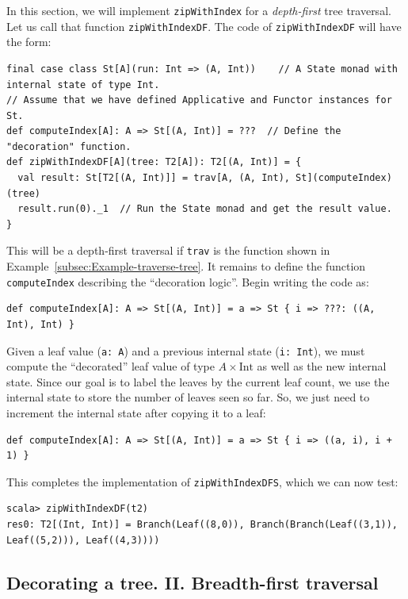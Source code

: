 In this section, we will implement \lstinline!zipWithIndex! for a
\emph{depth-first} tree traversal. Let us call that function \lstinline!zipWithIndexDF!.
The code of \lstinline!zipWithIndexDF! will have the form:
\begin{lstlisting}
final case class St[A](run: Int => (A, Int))    // A State monad with internal state of type Int.
// Assume that we have defined Applicative and Functor instances for St.
def computeIndex[A]: A => St[(A, Int)] = ???  // Define the "decoration" function.
def zipWithIndexDF[A](tree: T2[A]): T2[(A, Int)] = {
  val result: St[T2[(A, Int)]] = trav[A, (A, Int), St](computeIndex)(tree)
  result.run(0)._1  // Run the State monad and get the result value.
}
\end{lstlisting}
This will be a depth-first traversal if \lstinline!trav! is the function
shown in Example~\ref{subsec:Example-traverse-tree}. It remains
to define the function \lstinline!computeIndex! describing the \textsf{``}decoration
logic\textsf{''}. Begin writing the code as:
\begin{lstlisting}
def computeIndex[A]: A => St[(A, Int)] = a => St { i => ???: ((A, Int), Int) }
\end{lstlisting}
Given a leaf value (\lstinline!a: A!) and a previous internal state
(\lstinline!i: Int!), we must compute the \textsf{``}decorated\textsf{''} leaf value
of type $A\times\text{Int}$ as well as the new internal state. Since
our goal is to label the leaves by the current leaf count, we use
the internal state to store the number of leaves seen so far. So,
we just need to increment the internal state after copying it to a
leaf:
\begin{lstlisting}
def computeIndex[A]: A => St[(A, Int)] = a => St { i => ((a, i), i + 1) }
\end{lstlisting}
This completes the implementation of \lstinline!zipWithIndexDFS!,
which we can now test:
\begin{lstlisting}
scala> zipWithIndexDF(t2)
res0: T2[(Int, Int)] = Branch(Leaf((8,0)), Branch(Branch(Leaf((3,1)), Leaf((5,2))), Leaf((4,3))))
\end{lstlisting}


\subsection{Decorating a tree. II. Breadth-first traversal\label{subsec:Decorating-a-tree-breadth-first-traversal}}

